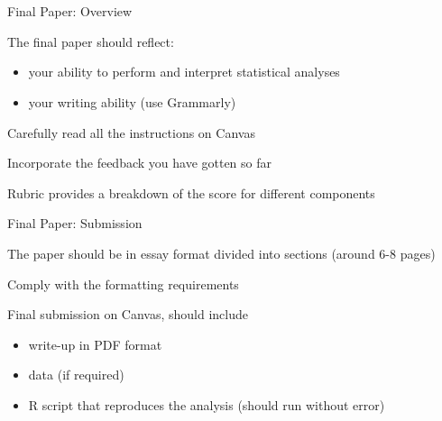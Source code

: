 \documentclass{./../Lectures/div_teaching_slides}
\begin{document}
\section{}
\subsection{\vspace{1em}}


\begin{frame}{Final Paper: Overview}
\begin{witemize}
\item The final paper should reflect:\\
  \begin{itemize}
  \item your ability to perform and interpret statistical analyses
  \item your writing ability (use Grammarly)
\end{itemize}
\item Carefully read all the instructions on Canvas
\item Incorporate the feedback you have gotten so far
\item Rubric provides a breakdown of the score for different components
\end{witemize}
\end{frame}

\begin{frame}{Final Paper: Submission}
\begin{witemize}
\item The paper should be in essay format divided into sections (around 6-8 pages)
\item Comply with the formatting requirements
\item Final submission on Canvas, should include \\
\begin{itemize}
  \normalsize
  \item write-up in PDF format
  \item data (if required)
  \item R script that reproduces the analysis (should run without error)
\end{itemize}
\end{witemize}
\end{frame}
\end{document}
